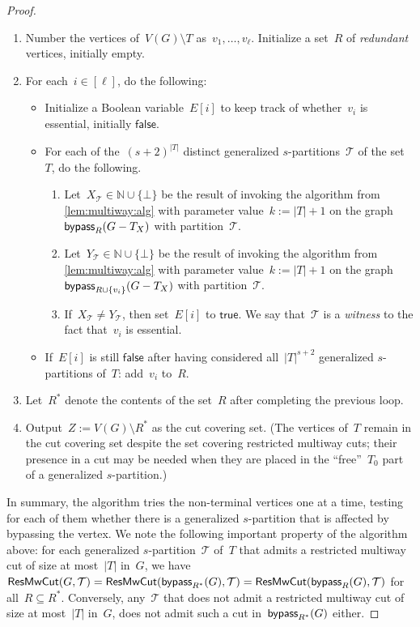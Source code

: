 \begin{proof}
\begin{enumerate}
	\item Number the vertices of~$V(G) \setminus T$ as~$v_1, \ldots, v_\ell$. Initialize a set~$R$ of \emph{redundant} vertices, initially empty.
	\item For each~$i \in [\ell]$, do the following:
	\begin{itemize}
		\item Initialize a Boolean variable~$E[i]$ to keep track of whether~$v_i$ is essential, initially $\mathsf{false}$.
		\item For each of the~$(s+2)^{|T|}$ distinct generalized $s$-partitions~$\mathcal{T}$ of the set~$T$, do the following.
		\begin{enumerate}
				\item Let~$X_{\mathcal{T}} \in \mathbb{N} \cup \{\bot\}$ be the result of invoking the algorithm from \cref{lem:multiway:alg} with parameter value~$k := |T| + 1$ on the graph~$\mathsf{bypass}_R(G - T_X)$ with partition~$\mathcal{T}$. 
				\item Let~$Y_{\mathcal{T}} \in \mathbb{N} \cup \{\bot\}$ be the result of invoking the algorithm from \cref{lem:multiway:alg} with parameter value~$k := |T| + 1$ on the graph~$\mathsf{bypass}_{R \cup \{v_i\}}(G - T_X)$ with partition~$\mathcal{T}$. 
				\item If~$X_\mathcal{T} \neq Y_{\mathcal{T}}$, then set~$E[i]$ to $\mathsf{true}$. We say that~$\mathcal{T}$ is a \emph{witness} to the fact that~$v_i$ is essential.
		\end{enumerate}
		\item If~$E[i]$ is still $\mathsf{false}$ after having considered all~$|T|^{s+2}$ generalized $s$-partitions of~$T$: add~$v_i$ to~$R$.
	\end{itemize}
	\item Let~$R^*$ denote the contents of the set~$R$ after completing the previous loop. 
	\item Output~$Z := V(G) \setminus R^*$ as the cut covering set. (The vertices of~$T$ remain in the cut covering set despite the set covering restricted multiway cuts; their presence in a cut may be needed when they are placed in the ``free''~$T_0$ part of a generalized $s$-partition.)
\end{enumerate}

In summary, the algorithm tries the non-terminal vertices one at a time, testing for each of them whether there is a generalized $s$-partition that is affected by bypassing the vertex. We note the following important property of the algorithm above: for each generalized $s$-partition~$\mathcal{T}$ of~$T$ that admits a restricted multiway cut of size at most~$|T|$ in~$G$, we have~$\mathsf{ResMwCut}(G,\mathcal{T}) = \mathsf{ResMwCut}(\mathsf{bypass}_{R^*}(G), \mathcal{T}) = \mathsf{ResMwCut}(\mathsf{bypass}_R(G), \mathcal{T})$ for all~$R \subseteq R^*$. Conversely, any~$\mathcal{T}$ that does not admit a restricted multiway cut of size at most~$|T|$ in~$G$, does not admit such a cut in~$\mathsf{bypass}_{R^*}(G)$ either.


\end{proof}
